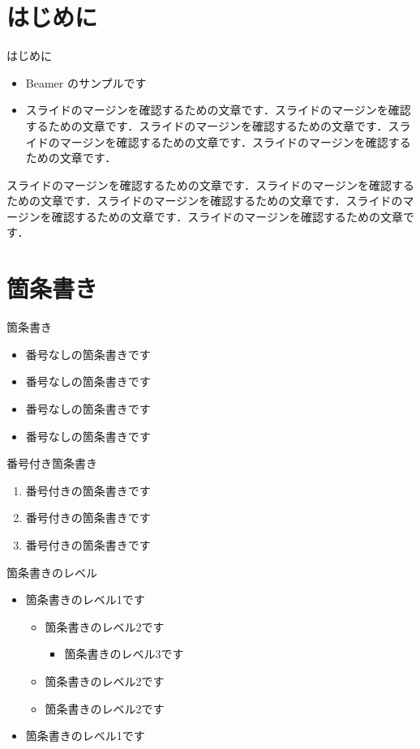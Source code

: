 \section{はじめに}

\begin{frame}{はじめに}
  \begin{itemize}
    \item Beamer のサンプルです
    \item スライドのマージンを確認するための文章です．スライドのマージンを確認するための文章です．スライドのマージンを確認するための文章です．スライドのマージンを確認するための文章です．スライドのマージンを確認するための文章です．
  \end{itemize}
  スライドのマージンを確認するための文章です．スライドのマージンを確認するための文章です．スライドのマージンを確認するための文章です．スライドのマージンを確認するための文章です．スライドのマージンを確認するための文章です．
\end{frame}

\section{箇条書き}

\begin{frame}{箇条書き}
  \begin{itemize}
    \item 番号なしの箇条書きです
    \item 番号なしの箇条書きです
    \item 番号なしの箇条書きです
    \item 番号なしの箇条書きです
  \end{itemize}
\end{frame}

\begin{frame}{番号付き箇条書き}
  \begin{enumerate}
    \item 番号付きの箇条書きです
    \item 番号付きの箇条書きです
    \item 番号付きの箇条書きです
  \end{enumerate}
\end{frame}

\begin{frame}{箇条書きのレベル}
  \begin{itemize}
    \item 箇条書きのレベル1です
    \begin{itemize}
      \item 箇条書きのレベル2です
      \begin{itemize}
        \item 箇条書きのレベル3です
      \end{itemize}
      \item 箇条書きのレベル2です
      \item 箇条書きのレベル2です
    \end{itemize}
    \item 箇条書きのレベル1です
  \end{itemize}
\end{frame}


